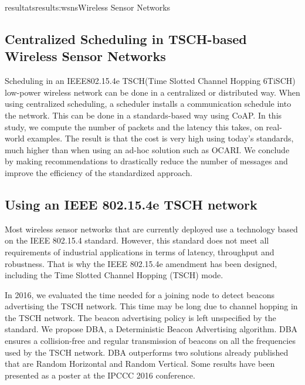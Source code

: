 \documentclass{ra2016}
\begin{document}
\begin{module}{resultats}{results:wsns}{Wireless Sensor Networks}
\subsection{Centralized Scheduling in TSCH-based Wireless Sensor Networks}

\begin{participants}
\end{participants}

Scheduling in an IEEE802.15.4e TSCH(Time Slotted Channel Hopping 6TiSCH) low-power wireless network can be done in a centralized or distributed way. 
When using centralized scheduling, a scheduler installs a communication schedule into the network.
This can be done in a standards-based way using CoAP.
In this study, we compute the number of packets and the latency this takes, on real-world examples.
The result is that the cost is very high using today's standards, much higher than when using an ad-hoc solution such as OCARI.
We conclude by making recommendations to drastically reduce the number of messages and improve the efficiency of the standardized approach.

\subsection{Using an IEEE 802.15.4e TSCH network}

\begin{participants}
\end{participants}  

Most wireless sensor networks that are currently deployed use a technology based on the IEEE 802.15.4 standard.
However, this standard does not meet all requirements of industrial applications in terms of latency, throughput and robustness.
That is why the IEEE 802.15.4e amendment has been designed, including the Time Slotted Channel Hopping (TSCH) mode.

In 2016, we evaluated the time needed for a joining node to detect beacons advertising the TSCH network.
This time may be long due to channel hopping in the TSCH network.
The beacon advertising policy is left unspecified by the standard.
We propose DBA, a Deterministic Beacon Advertising algorithm.
DBA ensures a collision-free and regular transmission of beacons on all the frequencies used by the TSCH network.
DBA outperforms two solutions already published that are Random Horizontal and Random Vertical.
Some results have been presented as a poster at the IPCCC 2016 conference.


\end{module}
\end{document}
